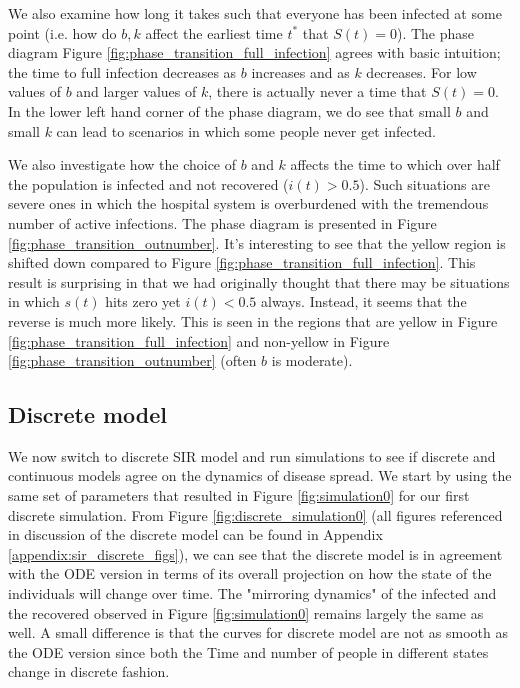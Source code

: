 \documentclass[12pt, reqno]{amsart}
\begin{document}
    We also examine how long it takes such that everyone has been infected at some point (i.e. how do \(b, k\) affect the earliest time \(t^*\) that \(S(t) = 0\)). The phase diagram Figure \ref{fig:phase_transition_full_infection} agrees with basic intuition; the time to full infection decreases as \(b\) increases and as \(k\) decreases. For low values of \(b\) and larger values of \(k\), there is actually never a time that \(S(t) = 0\). In the lower left hand corner of the phase diagram, we do see that small \(b\) and small \(k\) can lead to scenarios in which some people never get infected.

    We also investigate how the choice of \(b\) and \(k\) affects the time to which over half the population is infected and not recovered (\(i(t) > 0.5\)). Such situations are severe ones in which the hospital system is overburdened with the tremendous number of active infections. The phase diagram is presented in Figure \ref{fig:phase_transition_outnumber}. It's interesting to see that the yellow region is shifted down compared to Figure \ref{fig:phase_transition_full_infection}. This result is surprising in that we had originally thought that there may be situations in which \(s(t)\) hits zero yet \(i(t) < 0.5\) always. Instead, it seems that the reverse is much more likely. This is seen in the regions that are yellow in Figure \ref{fig:phase_transition_full_infection} and non-yellow in Figure \ref{fig:phase_transition_outnumber} (often \(b\) is moderate). 
    
    \subsection{Discrete model}
    
    We now switch to discrete SIR model and run simulations to see if discrete and continuous models agree on the dynamics of disease spread. We start by using the same set of parameters that resulted in Figure \ref{fig:simulation0} for our first discrete simulation. From Figure \ref{fig:discrete_simulation0} (all figures referenced in discussion of the discrete model can be found in Appendix \ref{appendix:sir_discrete_figs}), we can see that the discrete model is in agreement with the ODE version in terms of its overall projection on how the state of the individuals will change over time. The "mirroring dynamics" of the infected and the recovered observed in Figure \ref{fig:simulation0} remains largely the same as well. A small difference is that the curves for discrete model are not as smooth as the ODE version since both the Time and number of people in different states change in discrete fashion. 
    
\end{document}

